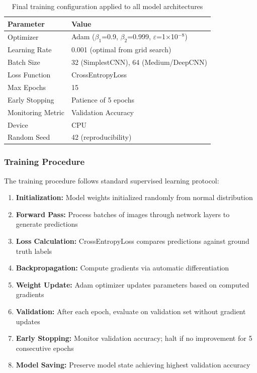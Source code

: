 \documentclass[12pt,a4paper]{article}
\begin{document}
\begin{table}[H]
\centering
\begin{tabular}{ll}
\toprule
\textbf{Parameter} & \textbf{Value} \\
\midrule
Optimizer & Adam ($\beta_1$=0.9, $\beta_2$=0.999, $\varepsilon$=1$\times$10$^{-8}$) \\
Learning Rate & 0.001 (optimal from grid search) \\
Batch Size & 32 (SimplestCNN), 64 (Medium/DeepCNN) \\
Loss Function & CrossEntropyLoss \\
Max Epochs & 15 \\
Early Stopping & Patience of 5 epochs \\
Monitoring Metric & Validation Accuracy \\
Device & CPU \\
Random Seed & 42 (reproducibility) \\
\bottomrule
\end{tabular}
\caption{Final training configuration applied to all model architectures}
\end{table}

\subsubsection{Training Procedure}

The training procedure follows standard supervised learning protocol:

\begin{enumerate}
    \item \textbf{Initialization:} Model weights initialized randomly from normal distribution
    \item \textbf{Forward Pass:} Process batches of images through network layers to generate predictions
    \item \textbf{Loss Calculation:} CrossEntropyLoss compares predictions against ground truth labels
    \item \textbf{Backpropagation:} Compute gradients via automatic differentiation
    \item \textbf{Weight Update:} Adam optimizer updates parameters based on computed gradients
    \item \textbf{Validation:} After each epoch, evaluate on validation set without gradient updates
    \item \textbf{Early Stopping:} Monitor validation accuracy; halt if no improvement for 5 consecutive epochs
    \item \textbf{Model Saving:} Preserve model state achieving highest validation accuracy
\end{enumerate}
\end{document}
